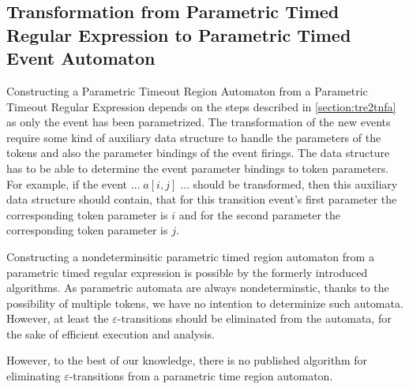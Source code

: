 \subsection{Transformation from Parametric Timed Regular Expression to Parametric Timed Event Automaton}
\label{section:ptre2tnfa}	
			
Constructing a Parametric Timeout Region Automaton from a Parametric Timeout Regular Expression depends on the steps described in \cref{section:tre2tnfa} as only the event has been parametrized. The transformation of the new events require some kind of auxiliary data structure to handle the parameters of the tokens and also the parameter bindings of the event firings. The data structure has to be able to determine the event parameter bindings to token parameters. For example, if the event $\dots \; a[i,j] \; \dots$ should be transformed, then this auxiliary data structure should contain, that for this transition event's first parameter the corresponding token parameter is $i$ and for the second parameter the corresponding token parameter is $j$. 
		
	
Constructing a nondeterminsitic parametric timed region automaton from a parametric timed regular expression is possible by the formerly introduced algorithms. As parametric automata are always nondeterminstic, thanks to the possibility of multiple tokens, we have no intention to determinize such automata.
However, at least the $\varepsilon$-transitions should be eliminated from the automata, for the sake of efficient execution and analysis.
		
However, to the best of our knowledge, there is no published algorithm for eliminating $\varepsilon$-transitions from a parametric time region automaton.%
		
